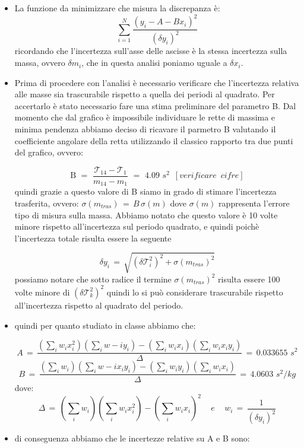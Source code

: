 \begin{itemize}
\item{La funzione da minimizzare che misura la discrepanza è:
		\begin{equation*}
			\sum_{i=1}^{N} \frac{(y_i - A - Bx_i)^2}{(\delta y_i)^2}
		\end{equation*}
		ricordando che l'incertezza sull'asse delle ascisse è la stessa incertezza sulla massa, ovvero $\delta m_i$, che in questa analisi poniamo uguale a $\delta x_i$.}
\item{Prima di procedere con l'analisi è necessario verificare che l'incertezza relativa alle masse sia trascurabile rispetto a quella dei periodi al quadrato. Per accertarlo è stato necessario fare una stima preliminare del parametro B. Dal momento che dal grafico è impossibile individuare le rette di massima e minima pendenza abbiamo deciso di ricavare il parmetro B valutando il coefficiente angolare della retta utilizzando il classico rapporto tra due punti del grafico, ovvero:

	\begin{equation*}
		\text{B} \,\,=\,\, \frac{\mathcal{T}_{14} - \mathcal{T}_{1}}{m_{14} - m_1} \,\,=\,\, 4.09 \,\, s^2 \,\,\,[verificare \,\,\,cifre]
	\end{equation*}
	quindi grazie a questo valore di B siamo in grado di stimare l'incertezza trasferita, ovvero: $\sigma (m_{tras}) \,=\, B \, \sigma (m)$ dove $\sigma (m)$ rappresenta l'errore tipo di misura sulla massa. Abbiamo notato che questo valore è 10 volte minore rispetto all'incertezza sul periodo quadrato, e quindi poichè l'incertezza totale risulta essere la seguente
	
	\begin{equation*}
		\delta y_i \,=\, \sqrt{(\delta \mathcal{T}_i^2)^2 + \sigma (m_{tras})^2} 
	\end{equation*}	
	possiamo notare che sotto radice il termine $\sigma (m_{tras})^2$ risulta essere 100 volte minore di $(\delta \mathcal{T}_k^2)^2$ quindi lo si può considerare trascurabile rispetto all'incertezza rispetto al quadrato del periodo.
	}
\item{quindi per quanto studiato in classe abbiamo che:

		\begin{equation*}
			A \,=\, \frac{(\sum_i w_i x_i^2)(\sum_i w-i y_i) - (\sum_i w_i x_i)(\sum_i w_i x_i y_i)}{\Delta} \,=\, 0.033655 \,\, s^2
		\end{equation*}
		\begin{equation*}
			B \,=\, \frac{(\sum_i w_i)(\sum_i w-i x_i y_i) - (\sum_i w_i y_i)(\sum_i w_i x_i)}{\Delta} \,=\, 4.0603 \,\, s^2 / kg
		\end{equation*}
		dove:
		\begin{equation*}
			\Delta \,=\, (\sum_i w_i)(\sum_i w_i x_i^2) - (\sum_i w_i x_i)^2 \,\,\,\,\,\,\, e \,\,\,\,\,\,\,
			w_i \,=\, \frac{1}{(\delta y_i)^2}
		\end{equation*}}
\item{di conseguenza abbiamo che le incertezze relative su A e B sono:

}
\end{itemize}
